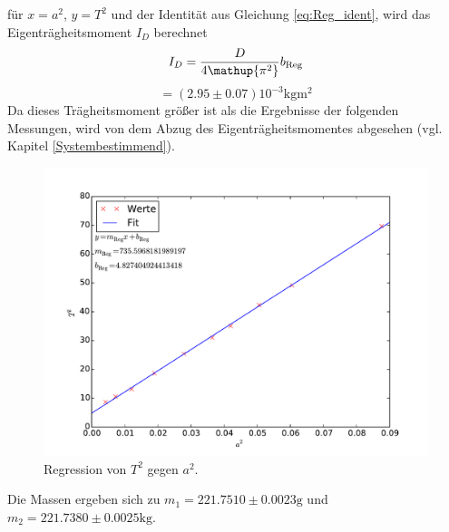 für $x=a^2$, $y=T^2$ und der Identität aus Gleichung \eqref{eq:Reg_ident}, wird das Eigenträgheitsmoment $I_D$ berechnet
\begin{equation*}
	I_D= \frac{D}{4\mathup{\pi^2}}b_{\text{Reg}}\\
\end{equation*}
\begin{equation}
	\label{wert:eigentragheit}
	= (2.95\pm0.07)10^{-3} \si{\kilo\gram\meter\squared}
\end{equation}
Da dieses Trägheitsmoment größer ist als die Ergebnisse der folgenden Messungen, wird von dem Abzug des Eigenträgheitsmomentes abgesehen (vgl. Kapitel \ref{Systembestimmend}). 
\begin{figure}[hp]
	\centering
	\label{fig:Regress}
	\includegraphics[width=\textwidth]{Bilder/Messung2.pdf}
	\caption{Regression von $T^2$ gegen $a^2$.}
\end{figure}
Die Massen ergeben sich zu $m_1=221.7510\pm0.0023\si{\gram}$ und $m_2= 221.7380\pm0.0025\si{\kilo\gram}$.

\newpage
